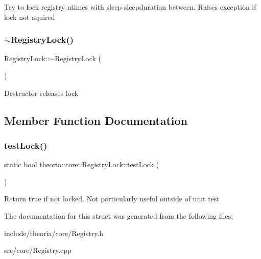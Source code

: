 Try to lock registry ntimes with sleep sleepduration between. Raises exception if lock not aquired \mbox{\label{structtheoria_1_1core_1_1RegistryLock_a374ac63681fd8b4fa891897eeeb75465}} 
\subsubsection{\texorpdfstring{$\sim$\+Registry\+Lock()}{~RegistryLock()}}
{\footnotesize\ttfamily Registry\+Lock\+::$\sim$\+Registry\+Lock (\begin{DoxyParamCaption}{ }\end{DoxyParamCaption})}

Destructor releases lock 

\subsection{Member Function Documentation}
\mbox{\label{structtheoria_1_1core_1_1RegistryLock_a28e3a44cfa3ef223db18db201e635254}} 
\subsubsection{\texorpdfstring{test\+Lock()}{testLock()}}
{\footnotesize\ttfamily static bool theoria\+::core\+::\+Registry\+Lock\+::test\+Lock (\begin{DoxyParamCaption}{ }\end{DoxyParamCaption})\hspace{0.3cm}{\ttfamily [static]}}

Return true if not locked. Not particularly useful outside of unit test 

The documentation for this struct was generated from the following files\+:\begin{DoxyCompactItemize}
\item 
include/theoria/core/Registry.\+h\item 
src/core/Registry.\+cpp\end{DoxyCompactItemize}
